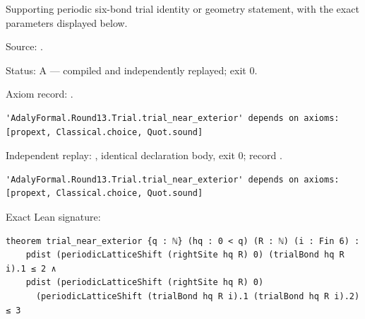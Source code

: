 \begin{theorem}[bp-369]
\label{bp-369}
\leanok
Supporting periodic six-bond trial identity or geometry statement, with the exact parameters displayed below.

\par Source: \texttt{}.
\par Status: A — compiled and independently replayed; exit 0.
\par Axiom record: \texttt{}.
\begin{verbatim}
'AdalyFormal.Round13.Trial.trial_near_exterior' depends on axioms: [propext, Classical.choice, Quot.sound]
\end{verbatim}
\par Independent replay: \texttt{}, identical declaration body, exit 0; record \texttt{}.
\begin{verbatim}
'AdalyFormal.Round13.Trial.trial_near_exterior' depends on axioms: [propext, Classical.choice, Quot.sound]
\end{verbatim}
\par Exact Lean signature:
\begin{verbatim}
theorem trial_near_exterior {q : ℕ} (hq : 0 < q) (R : ℕ) (i : Fin 6) :
    pdist (periodicLatticeShift (rightSite hq R) 0) (trialBond hq R i).1 ≤ 2 ∧
    pdist (periodicLatticeShift (rightSite hq R) 0)
      (periodicLatticeShift (trialBond hq R i).1 (trialBond hq R i).2) ≤ 3
\end{verbatim}
\end{theorem}

